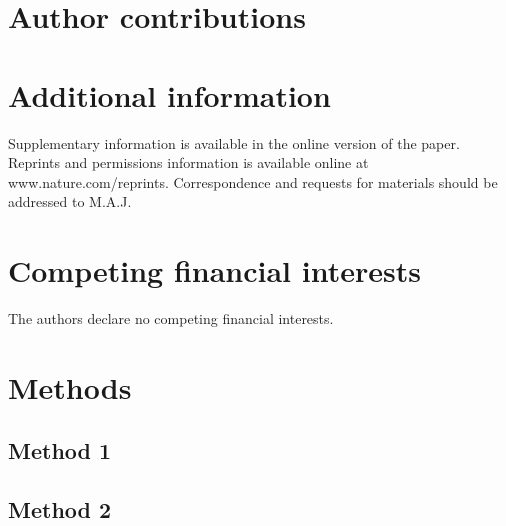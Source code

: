 \documentclass[twocolumn, linenumbers, superscriptaddress]{revtex4-1}
\begin{document}
	\begin{acknowledgements}
		\blindtext
	\end{acknowledgements}

	\section*{Author contributions}
		\blindtext
	
	\section*{Additional information}
		Supplementary information is available in the online version of the paper.
		Reprints and permissions information is available online at www.nature.com/reprints.
		Correspondence and requests for materials should be addressed to M.A.J.
	
	\section*{Competing financial interests}
		The authors declare no competing financial interests.
	
	\newpage

	\section*{Methods}
		\subsection*{Method 1}
			\blindtext[3]
			
		\subsection*{Method 2}
			\blindtext[3]
			
\end{document}
